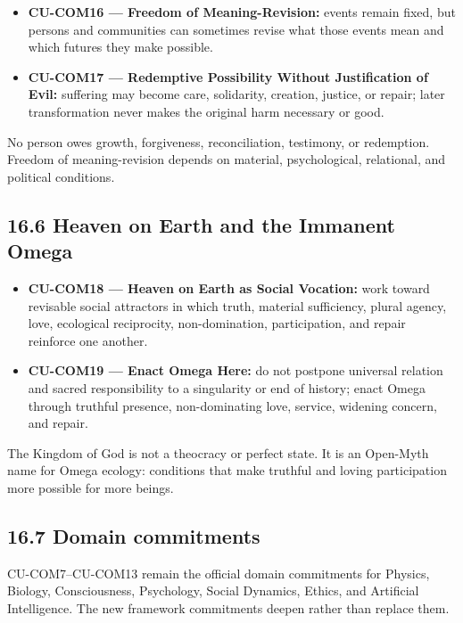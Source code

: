 \documentclass[
  11pt,
]{article}
\providecommand{\tightlist}{%
  \setlength{\itemsep}{0pt}\setlength{\parskip}{0pt}}
\begin{document}
\begin{itemize}
\tightlist
\item
  \textbf{CU-COM16 --- Freedom of Meaning-Revision:} events remain
  fixed, but persons and communities can sometimes revise what those
  events mean and which futures they make possible.
\item
  \textbf{CU-COM17 --- Redemptive Possibility Without Justification of
  Evil:} suffering may become care, solidarity, creation, justice, or
  repair; later transformation never makes the original harm necessary
  or good.
\end{itemize}

No person owes growth, forgiveness, reconciliation, testimony, or
redemption. Freedom of meaning-revision depends on material,
psychological, relational, and political conditions.

\subsection{16.6 Heaven on Earth and the Immanent
Omega}\label{heaven-on-earth-and-the-immanent-omega}

\begin{itemize}
\tightlist
\item
  \textbf{CU-COM18 --- Heaven on Earth as Social Vocation:} work toward
  revisable social attractors in which truth, material sufficiency,
  plural agency, love, ecological reciprocity, non-domination,
  participation, and repair reinforce one another.
\item
  \textbf{CU-COM19 --- Enact Omega Here:} do not postpone universal
  relation and sacred responsibility to a singularity or end of history;
  enact Omega through truthful presence, non-dominating love, service,
  widening concern, and repair.
\end{itemize}

The Kingdom of God is not a theocracy or perfect state. It is an
Open-Myth name for Omega ecology: conditions that make truthful and
loving participation more possible for more beings.

\subsection{16.7 Domain commitments}\label{domain-commitments}

CU-COM7--CU-COM13 remain the official domain commitments for Physics,
Biology, Consciousness, Psychology, Social Dynamics, Ethics, and
Artificial Intelligence. The new framework commitments deepen rather
than replace them.
\end{document}
